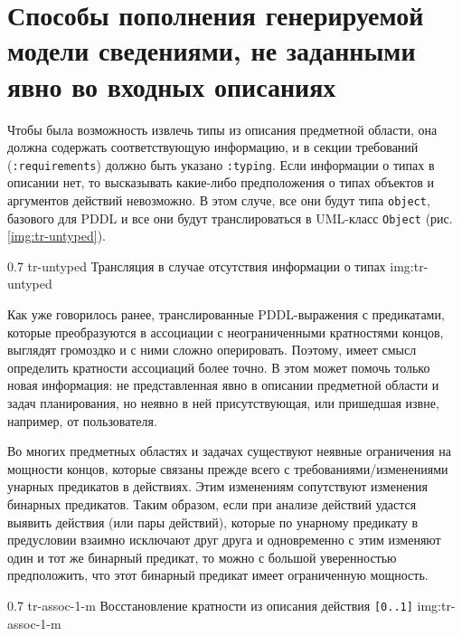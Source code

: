 \section{Способы пополнения генерируемой модели сведениями, не заданными явно во входных описаниях}

Чтобы была возможность извлечь типы из описания предметной области, она должна содержать соответствующую информацию, и в секции требований (\texttt{:requirements}) должно быть указано \texttt{:typing}. 
Если информации о типах в описании нет, то высказывать какие-либо предположения о типах объектов и аргументов действий невозможно.
В этом случе, все они будут типа \texttt{object}, базового для PDDL и все они будут транслироваться в UML-класс \texttt{Object} (рис. \ref{img:tr-untyped}).

{0.7}
{tr-untyped}
{Трансляция в случае отсутствия информации о типах}
{img:tr-untyped}


Как уже говорилось ранее, транслированные PDDL-выражения с предикатами, которые преобразуются в ассоциации с неограниченными кратностями концов, выглядят громоздко и с ними сложно оперировать. Поэтому, имеет смысл определить кратности ассоциаций более точно.
В этом может помочь только новая информация: не представленная явно в описании предметной области и задач планирования, но неявно в ней присутствующая, или пришедшая извне, например, от пользователя.

Во многих предметных областях и задачах существуют неявные ограничения на мощности концов, которые связаны прежде всего с требованиями/изменениями унарных предикатов в действиях. 
Этим изменениям сопутствуют изменения бинарных предикатов. 
Таким образом, если при анализе действий удастся выявить действия (или пары действий), которые по унарному предикату в предусловии взаимно исключают друг друга и одновременно с этим изменяют один и тот же бинарный предикат, то можно с большой уверенностью предположить, что этот бинарный предикат имеет ограниченную мощность.

{0.7}
{tr-assoc-1-m}
{Восстановление кратности из описания действия \texttt{[0..1]}}
{img:tr-assoc-1-m}

